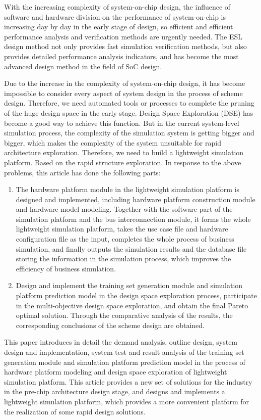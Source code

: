 \begin{abstract*}
  With the increasing complexity of system-on-chip design, the influence of software and hardware division on the performance of 
  system-on-chip is increasing day by day in the early stage of design, so efficient and efficient performance analysis and 
  verification methods are urgently needed. The ESL design method not only provides fast simulation verification methods, but 
  also provides detailed performance analysis indicators, and has become the most advanced design method in the field of SoC 
  design.

  Due to the increase in the complexity of system-on-chip design, it has become impossible to consider every aspect of system 
  design in the process of scheme design. Therefore, we need automated tools or processes to complete the pruning of the huge 
  design space in the early stage. Design Space Exploration (DSE) has become a good way to achieve this function. But in the 
  current system-level simulation process, the complexity of the simulation system is getting bigger and bigger, which makes 
  the complexity of the system unsuitable for rapid architecture exploration. Therefore, we need to build a lightweight simulation 
  platform. Based on the rapid structure exploration. In response to the above problems, this article has done the following parts:

  \begin{enumerate}
    \item The hardware platform module in the lightweight simulation platform is designed and implemented, including hardware platform construction module and hardware model modeling. Together with the software part of the simulation platform and the bus interconnection module, it forms the whole lightweight simulation platform, takes the use case file and hardware configuration file as the input, completes the whole process of business simulation, and finally outputs the simulation results and the database file storing the information in the simulation process, which improves the efficiency of business simulation.
    \item Design and implement the training set generation module and simulation platform prediction model in the design space exploration process, participate in the multi-objective design space exploration, and obtain the final Pareto optimal solution. Through the comparative analysis of the results, the corresponding conclusions of the scheme design are obtained.
  \end{enumerate}

  This paper introduces in detail the demand analysis, outline design, system design and implementation, system test and result analysis of the training set generation module and simulation platform prediction model in the process of hardware platform modeling and design space exploration of lightweight simulation platform. This 
  article provides a new set of solutions for the industry in the pre-chip architecture design stage, and designs and implements 
  a lightweight simulation platform, which provides a more convenient platform for the realization of some rapid design solutions.

\end{abstract*}
